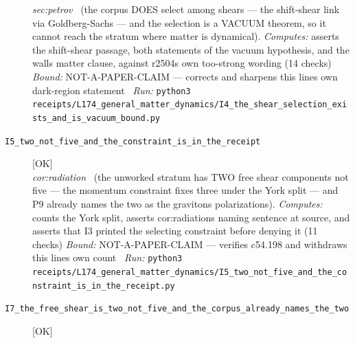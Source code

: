 \begin{description}
\textit{sec:petrov} \ (the corpus DOES select among shears --- the shift-shear link via Goldberg-Sachs --- and the selection is a VACUUM theorem, so it cannot reach the stratum where matter is dynamical). 
\emph{Computes:} asserts the shift-shear passage, both statements of the vacuum hypothesis, and the walls matter clause, against r2504s own too-strong wording (14 checks)
 \emph{Bound:} NOT-A-PAPER-CLAIM --- corrects and sharpens this lines own dark-region statement
\ \emph{Run:} \texttt{python3 receipts/L174\_general\_matter\_dynamics/I4\_the\_shear\_selection\_exists\_and\_is\_vacuum\_bound.py}
\item[\label{rcpt:I5_two_not_five_and_the_constraint_is_in_the_receipt}\textbf{}\quad\texttt{I5\_two\_not\_five\_and\_the\_constraint\_is\_in\_the\_receipt}]\hfill\textsf{[OK]}\\
\textit{cor:radiation} \ (the unworked stratum has TWO free shear components not five --- the momentum constraint fixes three under the York split --- and P9 already names the two as the gravitons polarizations). 
\emph{Computes:} counts the York split, asserts cor:radiations naming sentence at source, and asserts that I3 printed the selecting constraint before denying it (11 checks)
 \emph{Bound:} NOT-A-PAPER-CLAIM --- verifies c54.198 and withdraws this lines own count
\ \emph{Run:} \texttt{python3 receipts/L174\_general\_matter\_dynamics/I5\_two\_not\_five\_and\_the\_constraint\_is\_in\_the\_receipt.py}
\item[\label{rcpt:I7_the_free_shear_is_two_not_five_and_the_corpus_already_names_the_two}\textbf{}\quad\texttt{I7\_the\_free\_shear\_is\_two\_not\_five\_and\_the\_corpus\_already\_names\_the\_two}]\hfill\textsf{[OK]}\\

\end{description}
